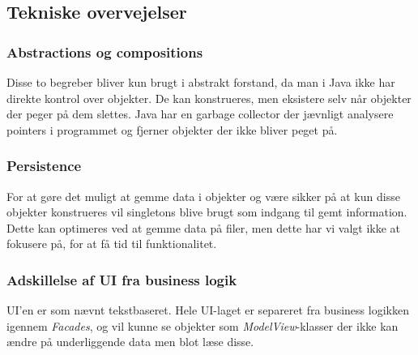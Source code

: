 \subsection{Tekniske overvejelser}
\subsubsection{Abstractions og compositions}
Disse to begreber bliver kun brugt i abstrakt forstand, da man i Java ikke har direkte kontrol over objekter. De kan konstrueres, men eksistere selv når objekter der peger på dem slettes. Java har en garbage collector der jævnligt analysere pointers i programmet og fjerner objekter der ikke bliver peget på.
\subsubsection{Persistence}
For at gøre det muligt at gemme data i objekter og være sikker på at kun disse objekter konstrueres vil singletons blive brugt som indgang til gemt information. Dette kan optimeres ved at gemme data på filer, men dette har vi valgt ikke at fokusere på, for at få tid til funktionalitet.
\subsubsection{Adskillelse af UI fra business logik}
UI'en er som nævnt tekstbaseret. Hele UI-laget er separeret fra business logikken igennem \textit{Facades}, og vil kunne se objekter som \textit{ModelView}-klasser der ikke kan ændre på underliggende data men blot læse disse.\newpage